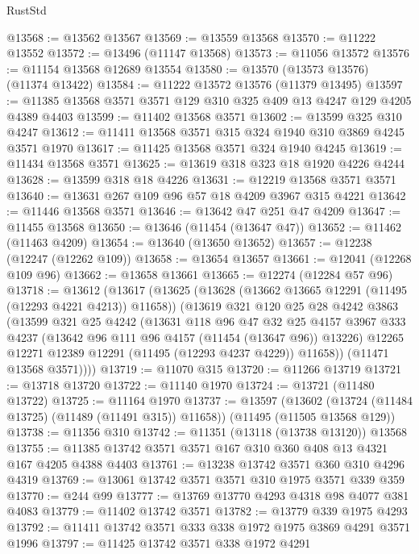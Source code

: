 \begin{lexlean}{RustStd}
\begin{coremodule}
@13568 := @13562 @13567
@13569 := @13559 @13568
@13570 := @11222 @13552
@13572 := @13496 (@11147 @13568)
@13573 := @11056 @13572
@13576 := @11154 @13568 @12689 @13554
@13580 := @13570 (@13573 @13576) (@11374 @13422)
@13584 := @11222 @13572 @13576 (@11379 @13495)
@13597 := @11385 @13568 @3571 @3571 @129 @310 @325 @409 @13 @4247 @129 @4205 @4389 @4403
@13599 := @11402 @13568 @3571
@13602 := @13599 @325 @310 @4247
@13612 := @11411 @13568 @3571 @315 @324 @1940 @310 @3869 @4245 @3571 @1970
@13617 := @11425 @13568 @3571 @324 @1940 @4245
@13619 := @11434 @13568 @3571
@13625 := @13619 @318 @323 @18 @1920 @4226 @4244
@13628 := @13599 @318 @18 @4226
@13631 := @12219 @13568 @3571 @3571
@13640 := @13631 @267 @109 @96 @57 @18 @4209 @3967 @315 @4221
@13642 := @11446 @13568 @3571
@13646 := @13642 @47 @251 @47 @4209
@13647 := @11455 @13568
@13650 := @13646 (@11454 (@13647 @47))
@13652 := @11462 (@11463 @4209)
@13654 := @13640 (@13650 @13652)
@13657 := @12238 (@12247 (@12262 @109))
@13658 := @13654 @13657
@13661 := @12041 (@12268 @109 @96)
@13662 := @13658 @13661
@13665 := @12274 (@12284 @57 @96)
@13718 := @13612
    (@13617
      (@13625
        (@13628 (@13662 @13665 @12291 (@11495 (@12293 @4221 @4213)) @11658))
        (@13619
          @321
          @120
          @25
          @28
          @4242
          @3863
          (@13599
            @321
            @25
            @4242
            (@13631
              @118
              @96
              @47
              @32
              @25
              @4157
              @3967
              @333
              @4237
              (@13642 @96 @111 @96 @4157 (@11454 (@13647 @96)) @13226)
              @12265
              @12271
              @12389
              @12291
              (@11495 (@12293 @4237 @4229))
              @11658))
          (@11471 @13568 @3571))))
@13719 := @11070 @315
@13720 := @11266 @13719
@13721 := @13718 @13720
@13722 := @11140 @1970
@13724 := @13721 (@11480 @13722)
@13725 := @11164 @1970
@13737 := @13597
    (@13602 (@13724 (@11484 @13725) (@11489 (@11491 @315)) @11658))
    (@11495 (@11505 @13568 @129))
@13738 := @11356 @310
@13742 := @11351 (@13118 (@13738 @13120)) @13568
@13755 := @11385 @13742 @3571 @3571 @167 @310 @360 @408 @13 @4321 @167 @4205 @4388 @4403
@13761 := @13238 @13742 @3571 @360 @310 @4296 @4319
@13769 := @13061 @13742 @3571 @3571 @310 @1975 @3571 @339 @359
@13770 := @244 @99
@13777 := @13769 @13770 @4293 @4318 @98 @4077 @381 @4083
@13779 := @11402 @13742 @3571
@13782 := @13779 @339 @1975 @4293
@13792 := @11411 @13742 @3571 @333 @338 @1972 @1975 @3869 @4291 @3571 @1996
@13797 := @11425 @13742 @3571 @338 @1972 @4291

\end{coremodule}
\end{lexlean}
